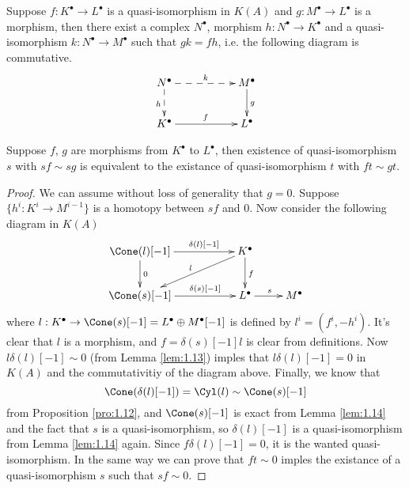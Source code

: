 \begin{lem}\label{lem:1.21}
	Suppose $f:K^\bullet \to L^\bullet$ is a quasi-isomorphism in $K(A)$ and $g:M^\bullet \to L^\bullet$ is a morphism, then there exist a complex $N^\bullet$, morphism $h:N^\bullet\to K^\bullet$ and a quasi-isomorphism $k:N^\bullet \to M^\bullet$ such that $gk=fh$, i.e. the following diagram is commutative.
	\[
		\xymatrix{
		N^\bullet \ar@{-->}[rr]^{k} \ar@{-->}[d]_{h} &  & M^\bullet \ar@{->}[d]^{g} \\
		K^\bullet \ar@{->}[rr]^{f} &  & L^\bullet
		}
	\]
\end{lem}

\begin{lem}\label{lem:1.22}
	Suppose $f$, $g$ are morphisms from $K^\bullet$ to $L^\bullet$, then existence of quasi-isomorphism $s$ with $sf\sim sg$ is equivalent to the existance of quasi-isomorphism $t$ with $ft\sim gt$.
\end{lem}

\begin{proof}
	We can assume without loss of generality that $g=0$. Suppose $\{h^i:K^i\to M^{i-1}\}$ is a homotopy between $sf$ and $0$. Now consider the following diagram in $K(A)$
	\[
		\xymatrix{
\Cone(l)[-1] \ar@{->}[rr]^-{\delta(l)[-1]}\ar[d]^0 && K^\bullet \ar@{->}[d]^{f} \ar@{->}[lld]_{l} &  \\
\Cone(s)[-1] \ar@{->}[rr]^-{{\delta(s)[-1]}} && L^\bullet \ar@{->}[r]^{s} & M^\bullet
}
	\]
	where $l:K^\bullet \to \Cone(s)[-1]=L^\bullet \oplus M^\bullet[-1]$ is defined by $l^i=(f^i,-h^i)$. It's clear that $l$ is a morphism, and $f=\delta(s)[-1]l$ is clear from definitions. Now $l\delta(l)[-1]\sim 0$ (from Lemma \ref{lem:1.13}) imples that $l\delta(l)[-1] = 0$ in $K(A)$ and the commutativitiy of the diagram above. Finally, we know that 
	\[
		\Cone(\delta(l)[-1])=\Cyl(l) \sim \Cone(s)[-1]
	\]
	from Proposition \ref{pro:1.12}, and $\Cone(s)[-1]$ is exact from Lemma \ref{lem:1.14} and the fact that $s$ is a quasi-isomorphism, so $\delta(l)[-1]$ is a quasi-isomorphism from Lemma \ref{lem:1.14} again. Since $f\delta(l)[-1]=0$, it is the wanted quasi-isomorphism. In the same way we can prove that $ft\sim 0$ imples the existance of a quasi-isomorphism $s$ such that $sf\sim 0$.
\end{proof}

